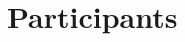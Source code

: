\documentclass[a4paper,UKenglish]{dagrep-v2018}
\begin{document}




\newpage
\section{Participants}
\end{document}

